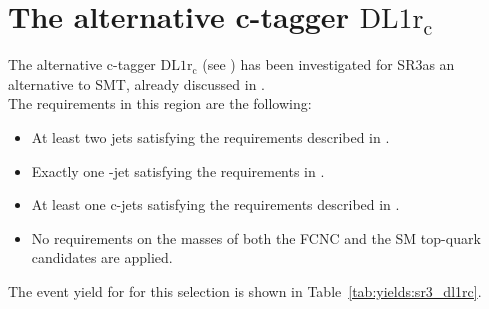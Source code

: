 \section {The alternative c-tagger $\mathrm{DL1r_{c}}$}
\label{sec:other_selection}
The alternative c-tagger $\mathrm{DL1r_{c}}$ (see ) has been investigated for SR3\tZc as an alternative to SMT, already discussed in .\\
The requirements in this region are the following:
\begin{itemize}
	\item At least two jets satisfying the requirements described in . 
	\item Exactly one \Pqb-jet satisfying the requirements in . 
	\item At least one c-jets satisfying the requirements described in .
	\item No requirements on the masses of both the FCNC and the SM top-quark candidates are applied. 
\end{itemize}
The event yield for  for this selection is shown in Table~\ref{tab:yields:sr3_dl1rc}.
